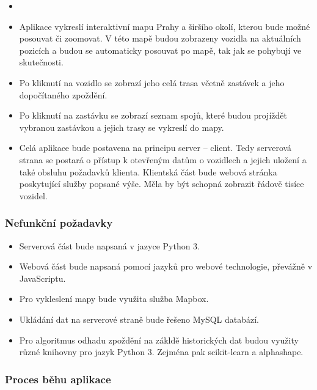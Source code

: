 \begin{itemize}
	\item

	\item Aplikace vykreslí interaktivní mapu Prahy a širšího okolí, kterou bude možné posouvat či zoomovat. V této mapě budou zobrazeny vozidla na aktuálních pozicích a budou se automaticky posouvat po mapě, tak jak se pohybují ve skutečnosti.

	\item Po kliknutí na vozidlo se zobrazí jeho celá trasa včetně zastávek a jeho dopočítaného zpoždění.

	\item Po kliknutí na zastávku se zobrazí seznam spojů, které budou projíždět vybranou zastávkou a jejich trasy se vykreslí do mapy.

	\item Celá aplikace bude postavena na principu server -- client. Tedy serverová strana se postará o přístup k otevřeným datům o vozidlech a jejich uložení a také obsluhu požadavků klienta. Klientská část bude webová stránka poskytující služby popsané výše. Měla by být schopná zobrazit řádově tisíce vozidel.
\end{itemize}

\subsubsection{Nefunkční požadavky}

\begin{itemize}
	\item Serverová část bude napsaná v jazyce Python 3.

	\item Webová část bude napsaná pomocí jazyků pro webové technologie, převážně v JavaScriptu.

	\item Pro vykleslení mapy bude využita služba Mapbox.

	\item Ukládání dat na serverové straně bude řešeno MySQL databází.

	\item Pro algoritmus odhadu zpoždění na zákldě historických dat budou využity různé knihovny pro jazyk Python 3. Zejména pak scikit-learn a alphashape.

\end{itemize}

\subsubsection{Proces běhu aplikace}

